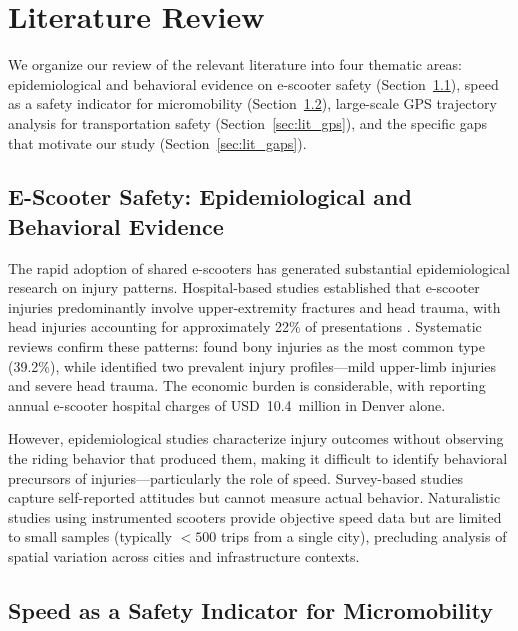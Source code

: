 \section{Literature Review}
\label{sec:literature}

We organize our review of the relevant literature into four thematic areas: epidemiological and behavioral evidence on e-scooter safety (Section~\ref{sec:lit_epi}), speed as a safety indicator for micromobility (Section~\ref{sec:lit_speed}), large-scale GPS trajectory analysis for transportation safety (Section~\ref{sec:lit_gps}), and the specific gaps that motivate our study (Section~\ref{sec:lit_gaps}).

\subsection{E-Scooter Safety: Epidemiological and Behavioral Evidence}
\label{sec:lit_epi}

The rapid adoption of shared e-scooters has generated substantial epidemiological research on injury patterns. Hospital-based studies established that e-scooter injuries predominantly involve upper-extremity fractures and head trauma, with head injuries accounting for approximately 22\% of presentations \citep{trivedi2019injuries, badeau2019emergency, bloom2021standing}. Systematic reviews confirm these patterns: \citet{singh2022impact} found bony injuries as the most common type (39.2\%), while \citet{spota2024injury} identified two prevalent injury profiles---mild upper-limb injuries and severe head trauma. The economic burden is considerable, with \citet{kahan2024escooter} reporting annual e-scooter hospital charges of USD~10.4~million in Denver alone.

However, epidemiological studies characterize injury outcomes without observing the riding behavior that produced them, making it difficult to identify behavioral precursors of injuries---particularly the role of speed. Survey-based studies capture self-reported attitudes \citep{haworth2021comparing} but cannot measure actual behavior. Naturalistic studies using instrumented scooters provide objective speed data \citep{ma2021escooter} but are limited to small samples (typically $< 500$ trips from a single city), precluding analysis of spatial variation across cities and infrastructure contexts.

\subsection{Speed as a Safety Indicator for Micromobility}
\label{sec:lit_speed}

